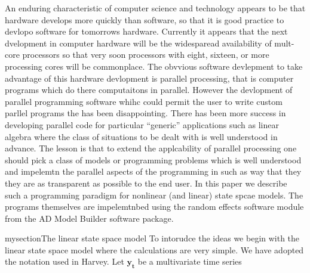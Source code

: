 
\def\wha{\widehat\alpha}
An enduring characteristic of computer science and technology
appears to be that hardware develops more quickly than software,
so that it is good practice to devlopo software for tomorrows
hardware. Currently it appears that the next dvelopment in computer hardware will be the widesparead availability of mult-core processors so that very soon
processors with eight, sixteen, or more processing cores will be commonplace.
The obvvious software devlepment to take advantage of this hardware devlopment 
is parallel processing, that is computer programs which do there computaitons in parallel. However the devlopment of parallel programming software 
whihc could permit the user to write custom parllel programs the has been 
disappointing. There has been more success in developing parallel code for
particular ``generic'' applications such as linear algebra 
where the class of situations to be dealt  with is well understood in advance.
The lesson is that to extend the applcability of parallel processing 
one should pick a class of models or programming problems which is 
well understood and impelemtn the parallel aspects of the programming in such as
way that they they are as transparent as possible to the end user.
In this paper we describe such a programming paradigm for 
nonlinear (and linear) state spcae models. The programs themselves are
impelemtnbed using the random effects software module from
the AD Model Builder software package.

\def\Byt{\boldsymbol{y_t}}
mysection{The linear state space model}
To intorudce the ideas we begin with the linear state space model where the
calculations are very simple. We have adopted the  notation used in Harvey.
Let $\Byt$ be a multivariate time series

